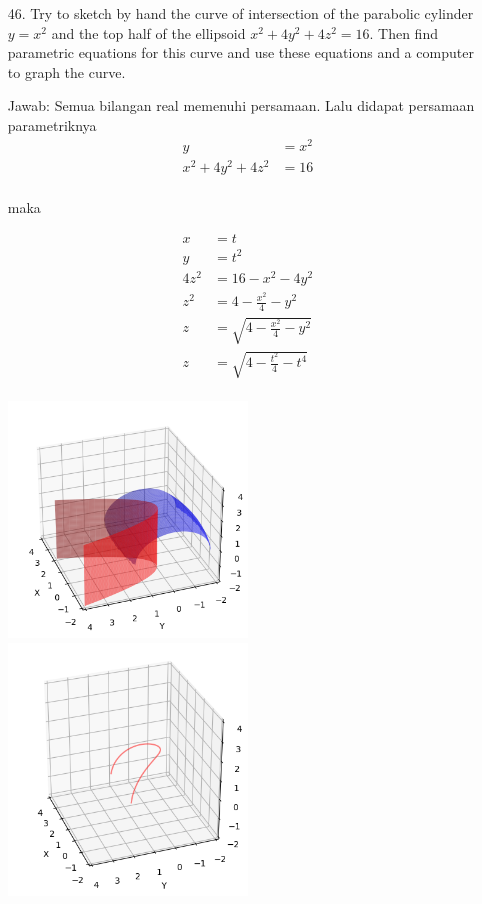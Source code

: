 \documentclass[twoside]{scrarticle}
\begin{document}
\begin{enumerate}
\item[46.] Try to sketch by hand the curve of intersection of the parabolic cylinder $y=x^2$ and the top half of the ellipsoid $x^2+4 y^2+4 z^2=16$. 
Then find parametric equations for this curve and use these equations and a computer to graph the curve.

Jawab: Semua bilangan real memenuhi persamaan. Lalu didapat persamaan parametriknya
\begin{equation*}
    \begin{aligned}
        y & = x^2\\
        x^2 + 4 y^2 + 4 z^2 & = 16\\
    \end{aligned}
\end{equation*}
\centerline{maka}
\begin{equation*}
    \begin{aligned}
        x & = t\\
        y & = t^2\\
        4z^2 & = 16 - x^2 - 4y^2\\
        z^2 & = 4 - \frac{x^2}{4} - y^2\\
        z & = \sqrt{4 - \frac{x^2}{4} - y^2}\\
        z & = \sqrt{4 - \frac{t^2}{4} - t^4}\\
    \end{aligned}
\end{equation*}

\begin{minipage}{\linewidth}
    \includegraphics[width=0.5\textwidth]{46.png}
    \includegraphics[width=0.5\textwidth]{46_1.png}
\end{minipage}


\end{enumerate}
\end{document}
